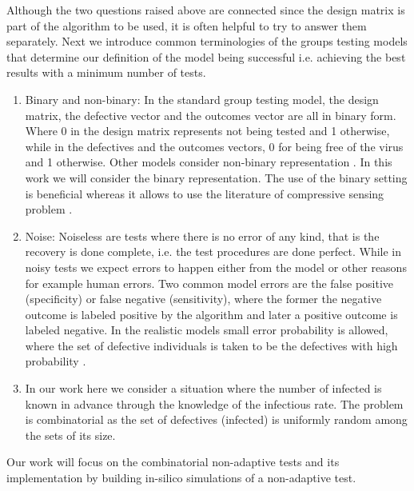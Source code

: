 Although the two questions raised above are connected since the design matrix is part of the algorithm to be used, it is often helpful to try to answer them separately.   
Next we introduce common terminologies of the groups testing models that determine our definition of the model being successful i.e. achieving the best results with a minimum number of tests.

\begin{enumerate}
	\item Binary and non-binary: In the standard group testing model, the design matrix, the defective vector and the outcomes vector are all in binary form. Where 0 in the design matrix represents not being tested and 1 otherwise, while in the defectives and the outcomes vectors, 0 for being free of the virus and 1 otherwise. Other models consider non-binary representation \cite{aldridge}. In this work we will consider the binary representation. The use of the binary setting is beneficial whereas it allows to use the literature of compressive sensing problem \cite{kubook}.   
	\item Noise: Noiseless are tests where there is no error of any kind, that is the recovery is done complete, i.e. the test procedures are done perfect. While in noisy tests we expect errors to happen either from the model or other reasons for example human errors. Two common model errors  are the false positive (specificity) or false negative (sensitivity), where the former the negative outcome is labeled positive by the algorithm and later a positive outcome is labeled negative. In the realistic models small error probability is allowed, where the set of defective individuals is taken to be the defectives with high probability \cite{kubook}. 
	
	\item In our work here we consider a situation where the number of infected is known in advance through the knowledge of the infectious rate. The problem is combinatorial as the set of defectives (infected) is uniformly random among the sets of its size.    
\end{enumerate}

Our work will focus on the combinatorial non-adaptive tests and its implementation  by building in-silico  simulations of a non-adaptive test. 

